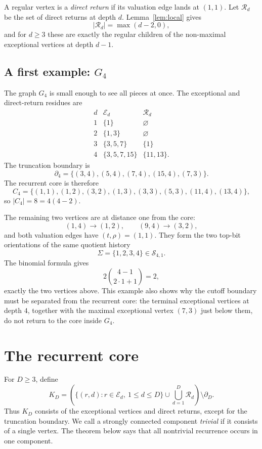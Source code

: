 \documentclass[11pt]{amsart}
\theoremstyle{definition}
\theoremstyle{remark}
\newcommand{\Ecal}{\mathcal E}
\newcommand{\Rcal}{\mathcal R}
\newcommand{\bdD}{\partial_D}
\newcommand{\Sfam}{\mathcal S}
\begin{document}
A regular vertex is a \emph{direct return} if its valuation edge lands at $(1,1)$.  Let $\Rcal_d$ be the set of direct returns at depth $d$.  Lemma~\ref{lem:local} gives
\[
|\Rcal_d|=\max(d-2,0),
\]
and for $d\ge3$ these are exactly the regular children of the non-maximal exceptional vertices at depth $d-1$.

\subsection{A first example: \texorpdfstring{$G_4$}{G4}}

The graph $G_4$ is small enough to see all pieces at once.  The exceptional and direct-return residues are
\[
\begin{array}{c|c|c}
d & \Ecal_d & \Rcal_d\\ \hline
1 & \{1\} & \varnothing\\
2 & \{1,3\} & \varnothing\\
3 & \{3,5,7\} & \{1\}\\
4 & \{3,5,7,15\} & \{11,13\}.
\end{array}
\]
The truncation boundary is
\[
\partial_4=\{(3,4),(5,4),(7,4),(15,4),(7,3)\}.
\]
The recurrent core is therefore
\[
C_4=\{(1,1),(1,2),(3,2),(1,3),(3,3),(5,3),(11,4),(13,4)\},
\]
so $|C_4|=8=4(4-2)$.

The remaining two vertices are at distance one from the core:
\[
(1,4)\to(1,2),\qquad (9,4)\to(3,2),
\]
and both valuation edges have $(t,\rho)=(1,1)$.  They form the two top-bit orientations of the same quotient history
\[
\Sigma=\{1,2,3,4\}\in\Sfam_{4,1}.
\]
The binomial formula gives
\[
2\binom{4-1}{2\cdot1+1}=2,
\]
exactly the two vertices above.  This example also shows why the cutoff boundary must be separated from the recurrent core: the terminal exceptional vertices at depth $4$, together with the maximal exceptional vertex $(7,3)$ just below them, do not return to the core inside $G_4$.

\section{The recurrent core}\label{sec:core}

For $D\ge3$, define
\[
K_D=\left(\{(r,d):r\in\Ecal_d,\ 1\le d\le D\}\cup\bigcup_{d=1}^D\Rcal_d\right)\setminus\bdD.
\]
Thus $K_D$ consists of the exceptional vertices and direct returns, except for the truncation boundary.  We call a strongly connected component \emph{trivial} if it consists of a single vertex.  The theorem below says that all nontrivial recurrence occurs in one component.
\end{document}

